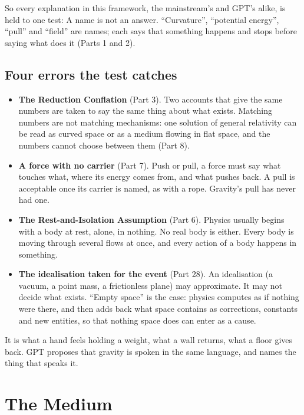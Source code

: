 So every explanation in this framework, the mainstream's and GPT's alike, is held to one test:  A name is not an answer. ``Curvature'', ``potential energy'', ``pull'' and ``field'' are names; each says that something happens and stops before saying what does it (Parts 1 and 2).

\subsection{Four errors the test catches}

\begin{itemize}
\item \textbf{The Reduction Conflation} (Part 3). Two accounts that give the same numbers are taken to say the same thing about what exists. Matching numbers are not matching mechanisms: one solution of general relativity can be read as curved space or as a medium flowing in flat space, and the numbers cannot choose between them (Part 8).
\item \textbf{A force with no carrier} (Part 7). Push or pull, a force must say what touches what, where its energy comes from, and what pushes back. A pull is acceptable once its carrier is named, as with a rope. Gravity's pull has never had one.
\item \textbf{The Rest-and-Isolation Assumption} (Part 6). Physics usually begins with a body at rest, alone, in nothing. No real body is either. Every body is moving through several flows at once, and every action of a body happens in something.
\item \textbf{The idealisation taken for the event} (Part 28). An idealisation (a vacuum, a point mass, a frictionless plane) may approximate. It may not decide what exists. ``Empty space'' is the case: physics computes as if nothing were there, and then adds back what space contains as corrections, constants and new entities, so that nothing space does can enter as a cause.
\end{itemize}

 It is what a hand feels holding a weight, what a wall returns, what a floor gives back. GPT proposes that gravity is spoken in the same language, and names the thing that speaks it.

\section{The Medium}

